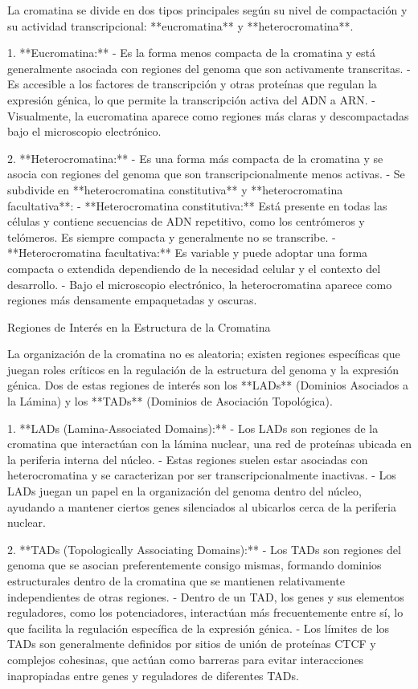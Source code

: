 La cromatina se divide en dos tipos principales según su nivel de compactación y su actividad transcripcional: **eucromatina** y **heterocromatina**.

1. **Eucromatina:**
- Es la forma menos compacta de la cromatina y está generalmente asociada con regiones del genoma que son activamente transcritas.
- Es accesible a los factores de transcripción y otras proteínas que regulan la expresión génica, lo que permite la transcripción activa del ADN a ARN.
- Visualmente, la eucromatina aparece como regiones más claras y descompactadas bajo el microscopio electrónico.

2. **Heterocromatina:**
- Es una forma más compacta de la cromatina y se asocia con regiones del genoma que son transcripcionalmente menos activas.
- Se subdivide en **heterocromatina constitutiva** y **heterocromatina facultativa**:
- **Heterocromatina constitutiva:** Está presente en todas las células y contiene secuencias de ADN repetitivo, como los centrómeros y telómeros. Es siempre compacta y generalmente no se transcribe.
- **Heterocromatina facultativa:** Es variable y puede adoptar una forma compacta o extendida dependiendo de la necesidad celular y el contexto del desarrollo.
- Bajo el microscopio electrónico, la heterocromatina aparece como regiones más densamente empaquetadas y oscuras.

Regiones de Interés en la Estructura de la Cromatina

La organización de la cromatina no es aleatoria; existen regiones específicas que juegan roles críticos en la regulación de la estructura del genoma y la expresión génica. Dos de estas regiones de interés son los **LADs** (Dominios Asociados a la Lámina) y los **TADs** (Dominios de Asociación Topológica).

1. **LADs (Lamina-Associated Domains):**
- Los LADs son regiones de la cromatina que interactúan con la lámina nuclear, una red de proteínas ubicada en la periferia interna del núcleo.
- Estas regiones suelen estar asociadas con heterocromatina y se caracterizan por ser transcripcionalmente inactivas.
- Los LADs juegan un papel en la organización del genoma dentro del núcleo, ayudando a mantener ciertos genes silenciados al ubicarlos cerca de la periferia nuclear.

2. **TADs (Topologically Associating Domains):**
- Los TADs son regiones del genoma que se asocian preferentemente consigo mismas, formando dominios estructurales dentro de la cromatina que se mantienen relativamente independientes de otras regiones.
- Dentro de un TAD, los genes y sus elementos reguladores, como los potenciadores, interactúan más frecuentemente entre sí, lo que facilita la regulación específica de la expresión génica.
- Los límites de los TADs son generalmente definidos por sitios de unión de proteínas CTCF y complejos cohesinas, que actúan como barreras para evitar interacciones inapropiadas entre genes y reguladores de diferentes TADs.

